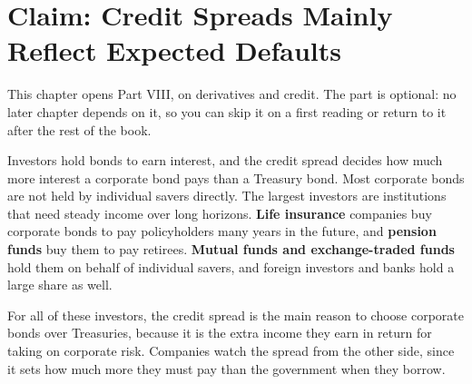 \makeatletter
{}
\makeatother

\makeatletter
\makeatother

\chapter{Claim: Credit Spreads Mainly Reflect Expected Defaults}
\label{ch:16}

This chapter opens Part VIII, on derivatives and credit. The part is optional: no later chapter depends on it, so you can skip it on a first reading or return to it after the rest of the book.

Investors hold bonds to earn interest, and the credit spread decides how much more interest a corporate bond pays than a Treasury bond. Most corporate bonds are not held by individual savers directly. The largest investors are institutions that need steady income over long horizons. \textbf{Life insurance} companies buy corporate bonds to pay policyholders many years in the future, and \textbf{pension funds} buy them to pay retirees. \textbf{Mutual funds and exchange-traded funds} hold them on behalf of individual savers, and foreign investors and banks hold a large share as well.

For all of these investors, the credit spread is the main reason to choose corporate bonds over Treasuries, because it is the extra income they earn in return for taking on corporate risk. Companies watch the spread from the other side, since it sets how much more they must pay than the government when they borrow.


